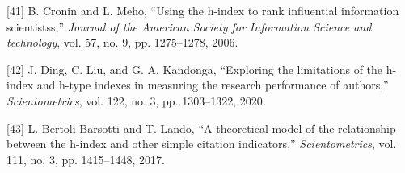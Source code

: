 \documentclass[12pt]{article}
\begin{document}
\leavevmode\hypertarget{ref-cronin06:hindex}{}%
{[}41{]} B. Cronin and L. Meho, ``Using the h-index to rank influential information scientistss,'' \emph{Journal of the American Society for Information Science and technology}, vol. 57, no. 9, pp. 1275--1278, 2006.

\leavevmode\hypertarget{ref-ding20:exploring}{}%
{[}42{]} J. Ding, C. Liu, and G. A. Kandonga, ``Exploring the limitations of the h-index and h-type indexes in measuring the research performance of authors,'' \emph{Scientometrics}, vol. 122, no. 3, pp. 1303--1322, 2020.

\leavevmode\hypertarget{ref-bertoli17:theoretical}{}%
{[}43{]} L. Bertoli-Barsotti and T. Lando, ``A theoretical model of the relationship between the h-index and other simple citation indicators,'' \emph{Scientometrics}, vol. 111, no. 3, pp. 1415--1448, 2017.


%
%
\end{document}
